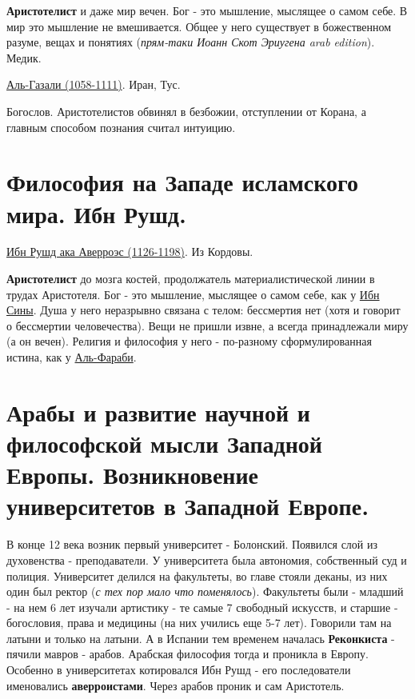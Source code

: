\documentclass[12pt,a4paper]{article}
\begin{document}
\textbf{Аристотелист} и даже мир вечен. Бог - это мышление, мыслящее о самом себе. В мир это мышление не вмешивается.
Общее у него существует в божественном разуме, вещах и понятиях (\textit{прям-таки Иоанн Скот Эриугена arab edition}). Медик.

\underline{Аль-Газали (1058-1111)}. Иран, Тус.

Богослов. Аристотелистов обвинял в безбожии, отступлении от Корана, а главным способом познания считал интуицию. 

\section{Философия на Западе исламского мира. Ибн Рушд.}

\underline{Ибн Рушд ака Аверроэс (1126-1198)}. Из Кордовы.

\textbf{Аристотелист} до мозга костей, продолжатель материалистической линии в трудах Аристотеля. Бог - это мышление, мыслящее о самом себе, как у \underline{Ибн Сины}. Душа у него неразрывно связана с телом: бессмертия нет (хотя и говорит о бессмертии человечества). Вещи не пришли извне, а всегда принадлежали миру (а он вечен). Религия и философия у него - по-разному сформулированная истина, как у \underline{Аль-Фараби}.


\section{Арабы и развитие научной и философской мысли Западной Европы. Возникновение университетов в Западной Европе.}
В конце 12 века возник первый университет - Болонский. Появился слой из духовенства - преподаватели. У университета была автономия, собственный суд и полиция. Университет делился на факультеты, во главе стояли деканы, из них один был ректор (\textit{с тех пор мало что поменялось}). Факультеты были - младший - на нем 6 лет изучали артистику - те самые 7 свободный искусств, и старшие - богословия, права и медицины (на них учились еще 5-7 лет). Говорили там на латыни и только на латыни. 
А в Испании тем временем началась \textbf{Реконкиста} - пячили мавров - арабов. Арабская философия тогда и проникла в Европу. Особенно в университетах котировался Ибн Рушд - его последователи именовались \textbf{аверроистами}. Через арабов проник и сам Аристотель.

\newpage
\end{document}
